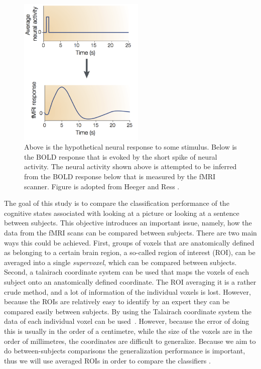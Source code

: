 \documentclass[preprint,journal,11pt]{vgtc}
\begin{document}
\begin{figure}
	\centering
	\includegraphics[width=60mm]{figures/f1_bold_response}
  	\caption{Above is the hypothetical neural response to some stimulus. Below is the BOLD response that is evoked by the short spike of neural activity. The neural activity shown above is attempted to be inferred from the BOLD response below that is measured by the fMRI scanner. Figure is adopted from Heeger and Ress \cite{he:2002na}.}
  	\label{fig:bold_response}
\end{figure}

The goal of this study is to compare the classification performance of the cognitive states associated with looking at a picture or looking at a sentence between subjects. This objective introduces an important issue, namely, how the data from the fMRI scans can be compared between subjects. There are two main ways this could be achieved. First, groups of voxels that are anatomically defined as belonging to a certain brain region, a so-called region of interest (ROI), can be averaged into a single \emph{supervoxel}, which can be compared between subjects. Second, a talairach coordinate system can be used that maps the voxels of each subject onto an anatomically defined coordinate. The ROI averaging it is a rather crude method, and a lot of information of the individual voxels is lost. However, because the ROIs are relatively easy to identify by an expert they can be compared easily between subjects. By using the Talairach coordinate system the data of each individual voxel can be used~\cite{talairach1988co}. However, because the error of doing this is usually in the order of a centimetre, while the size of the voxels are in the order of millimetres, the coordinates are difficult to generalize. Because we aim to do between-subjects comparisons the generalization performance is important, thus we will use averaged ROIs in order to compare the classifiers \cite{mi:2004coord}.
\end{document}

